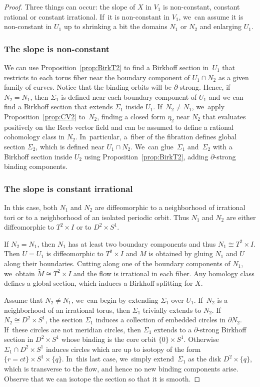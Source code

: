 \documentclass[11pt]{article}
\theoremstyle{definition}
\begin{document}
\begin{proof}
Three things can occur: the slope of $X$ in $V_1$ is non-constant, constant rational or constant irrational. If~it is non-constant in $V_1$, we~can assume it is non-constant in $U_1$ up to shrinking a bit the domains $N_1$ or $N_2$ and enlarging $U_1$.

\subsubsection*{The slope is non-constant} We can use Proposition~\ref{prop:BirkT2} to find a Birkhoff section in~$U_1$ that restricts to each torus fiber near the boundary component of $U_1\cap N_2$ as a given family of curves. Notice that the binding orbits will be $\partial$-strong. Hence, if~$N_2=N_1$, then $\Sigma_1$ is defined near each boundary component of $U_1$ and we can find a Birkhoff section that extends $\Sigma_1$ inside $U_1$. If~$N_2\neq N_1$, we~apply Proposition~\ref{prop:CV2} to~$N_2$, finding a closed form $\eta_2$ near $N_2$ that evaluates positively on the Reeb vector field and can be assumed to define a rational cohomology class in $N_2$. In~particular, a~fiber of the fibration defines global section $\Sigma_2$, which is defined near $U_1\cap N_2$. We~can glue~$\Sigma_1$ and~$\Sigma_2$ with a Birkhoff section inside $U_2$ using Proposition~\ref{prop:BirkT2}, adding $\partial$-strong binding components.

\subsubsection*{The slope is constant irrational}
In this case, both $N_1$ and $N_2$ are diffeomorphic to a neighborhood of irrational tori or to a neighborhood of an isolated periodic orbit. Thus $N_1$ and $N_2$ are either diffeomorphic to $T^2\times I$ or to $D^2\times S^1$.

If $N_2=N_1$, then $N_1$ has at least two boundary components and thus $N_1\cong T^2\times I$. Then $U=U_1$ is diffeomorphic to $T^2\times I$ and $M$ is obtained by gluing $N_1$ and $U$ along their boundaries. Cutting along one of the boundary components of $N_1$, we~obtain $\widetilde{M}\cong T^2\times I$ and the flow is irrational in each fiber. Any homology class defines a global section, which induces a Birkhoff splitting for $X$.

Assume that $N_2\neq N_1$, we~can begin by extending $\Sigma_1$ over $U_1$. If~$N_2$ is a neighborhood of an irrational torus, then $\Sigma_1$ trivially extends to $N_2$.
If $N_2\cong D^2\times S^1$, the section $\Sigma_1$ induces a collection of embedded circles in $\partial N_2$. If~these circles are not meridian circles, then $\Sigma_1$ extends to a $\partial$-strong Birkhoff section in $D^2\times S^1$ whose binding is the core orbit $\{0\}\times S^1$. Otherwise $\Sigma_1\cap D^2\times S^1$ induces circles which are up to isotopy of the form $\{r=ct\}\times S^1 \times \{q\}$. In~this last case, we~simply extend~$\Sigma_1$ as the disk $D^2\times \{q\}$, which is transverse to the flow, and hence no new binding components arise. Observe that we can isotope the section so that it is smooth.


\end{proof}
\end{document}
